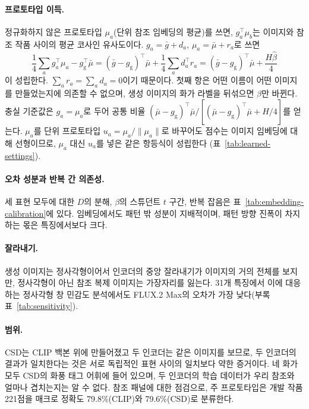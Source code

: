 \paragraph{프로토타입 이득.} 정규화하지 않은 프로토타입 $\mu_a$(단위 참조 임베딩의 평균)를 쓰면,
$g_a^\top\mu_b$는 이미지와 참조 작품 사이의 평균 코사인 유사도이다. $g_a=\bar g+d_a$,
$\mu_a=\bar\mu+r_a$로 쓰면
\begin{equation}
\frac14\sum_a g_a^\top\mu_a-g_{\mathrm g}^\top\bar\mu
=(\bar g-g_{\mathrm g})^\top\bar\mu+\frac14\sum_a d_a^\top r_a
=(\bar g-g_{\mathrm g})^\top\bar\mu+\frac{H\widehat\beta}{4}
\end{equation}
이 성립한다. $\sum_a r_a=\sum_a d_a=0$이기 때문이다. 첫째 항은 어떤 이름이 어떤 이미지를 만들었는지에
의존할 수 없으며, 생성 이미지의 화가 라벨을 뒤섞으면 $\widehat\beta$만 바뀐다. 충실 기준값은
$g_a=\mu_a$로 두어 공통 비율 $(\bar\mu-g_{\mathrm g})^\top\bar\mu/[(\bar\mu-g_{\mathrm
g})^\top\bar\mu+H/4]$를 얻는다. $\mu_a$를 단위 프로토타입 $u_a=\mu_a/\|\mu_a\|$로 바꾸어도 점수는
이미지 임베딩에 대해 선형이므로, $\mu_a$ 대신 $u_a$를 넣은 같은 항등식이 성립한다
(표~\ref{tab:learned-settings}).







\paragraph{오차 성분과 반복 간 의존성.} 세 표현 모두에 대한 $D$의 분해, $\beta$의 스튜던트 $t$ 구간,
반복 잡음은 표~\ref{tab:embedding-calibration}에 있다. 임베딩에서도 패턴 밖 성분이 지배적이며, 패턴
방향 진폭이 차지하는 몫은 특징에서보다 크다.

\paragraph{잘라내기.} 생성 이미지는 정사각형이어서 인코더의 중앙 잘라내기가 이미지의 거의 전체를
보지만, 정사각형이 아닌 참조 복제 이미지는 가장자리를 잃는다. 31개 특징에서 이에 대응하는 정사각형
창 민감도 분석에서도 FLUX.2 Max의 오차가 가장 낮다(부록 표~\ref{tab:sensitivity}).

\paragraph{범위.} CSD는 CLIP 백본 위에 만들어졌고 두 인코더는 같은 이미지를 보므로, 두 인코더의 결과가
일치한다는 것은 서로 독립적인 표현 사이의 일치보다 약한 증거이다. 네 화가 모두 CSD의 화풍 태그
어휘에 들어 있으며, 두 인코더의 학습 데이터가 우리 참조와 얼마나 겹치는지는 알 수 없다. 참조 패널에
대한 점검으로, 주 프로토타입은 개발 작품 221점을 매크로 정확도 79.8\%(CLIP)와 79.6\%(CSD)로
분류한다.

